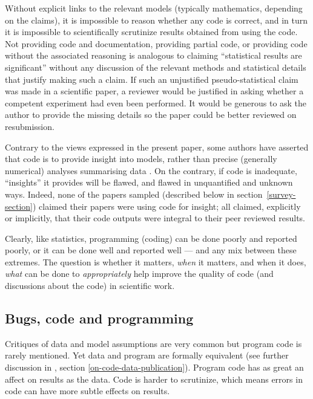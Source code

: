 Without explicit links to the relevant models (typically mathematics, depending on the claims), it is impossible to reason whether any code is correct, and in turn it is impossible to scientifically scrutinize results obtained from using the code. Not providing code and documentation, providing partial code, or providing code without the associated reasoning is analogous to claiming ``statistical results are significant'' without any discussion of the relevant methods and statistical details that justify making such a claim. If such an unjustified pseudo-statistical claim was made in a scientific paper, a reviewer would be justified in asking whether a competent experiment had even been performed. It would be generous to ask the author to provide the missing details so the paper could be better reviewed on resubmission. 

Contrary to the views expressed in the present paper, some authors have asserted that code is to provide insight into models, rather than precise (generally numerical) analyses summarising data \cite{assessing-quality}. On the contrary, if code is inadequate, ``insights'' it provides will be flawed, and flawed in unquantified and unknown ways. Indeed, none of the papers sampled (described below in section~\ref{survey-section}) claimed their papers were using code for insight; all claimed, explicitly or implicitly, that their code outputs were integral to their peer reviewed results.

Clearly, like statistics, programming (coding) can be done poorly and reported poorly, or it can be done well and reported well --- and any mix between these extremes. The question is whether it matters, \emph{when\/} it matters, and when it does, \emph{what\/} can be done to \emph{appropriately\/} help improve the quality of code (and discussions about the code) in scientific work.


\subsection{Bugs, code and programming}\label{knowledge}
Critiques of data and model assumptions are very common \cite{critiques,diagnosis-reviews} but program code is rarely mentioned. Yet data and program are formally equivalent (see further discussion in \supplement, section \ref{on-code-data-publication}). Program code has as great an affect on results as the data. Code is harder to scrutinize, which means errors in code can have more subtle effects on results.

